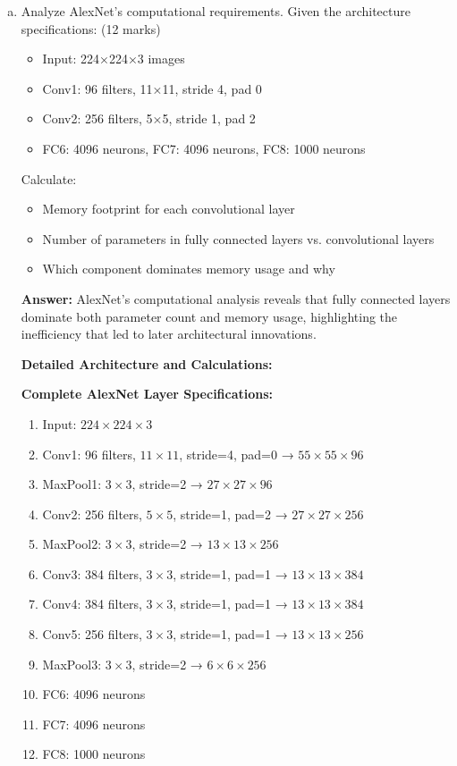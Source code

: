\documentclass[12pt]{article}
\newcommand{\answer}[1]{{\color{answercolor}\textbf{Answer:} #1}}
\newcommand{\explanation}[1]{{\color{explanationcolor}#1}}
\begin{document}
\begin{enumerate}[(a)]
    \item Analyze AlexNet's computational requirements. Given the architecture specifications: \hfill (12 marks)
    \begin{itemize}
        \item Input: 224×224×3 images
        \item Conv1: 96 filters, 11×11, stride 4, pad 0
        \item Conv2: 256 filters, 5×5, stride 1, pad 2
        \item FC6: 4096 neurons, FC7: 4096 neurons, FC8: 1000 neurons
    \end{itemize}
    
    Calculate:
    \begin{itemize}
        \item Memory footprint for each convolutional layer
        \item Number of parameters in fully connected layers vs. convolutional layers
        \item Which component dominates memory usage and why
    \end{itemize}
    
    \answer{AlexNet's computational analysis reveals that fully connected layers dominate both parameter count and memory usage, highlighting the inefficiency that led to later architectural innovations.}
    
    \explanation{
    \textbf{Detailed Architecture and Calculations:}
    
    \textbf{Complete AlexNet Layer Specifications:}
    \begin{enumerate}
        \item Input: $224 \times 224 \times 3$
        \item Conv1: 96 filters, $11 \times 11$, stride=4, pad=0 → $55 \times 55 \times 96$
        \item MaxPool1: $3 \times 3$, stride=2 → $27 \times 27 \times 96$  
        \item Conv2: 256 filters, $5 \times 5$, stride=1, pad=2 → $27 \times 27 \times 256$
        \item MaxPool2: $3 \times 3$, stride=2 → $13 \times 13 \times 256$
        \item Conv3: 384 filters, $3 \times 3$, stride=1, pad=1 → $13 \times 13 \times 384$
        \item Conv4: 384 filters, $3 \times 3$, stride=1, pad=1 → $13 \times 13 \times 384$
        \item Conv5: 256 filters, $3 \times 3$, stride=1, pad=1 → $13 \times 13 \times 256$
        \item MaxPool3: $3 \times 3$, stride=2 → $6 \times 6 \times 256$
        \item FC6: 4096 neurons
        \item FC7: 4096 neurons  
        \item FC8: 1000 neurons
    \end{enumerate}
    
}
\end{enumerate}
\end{document}
